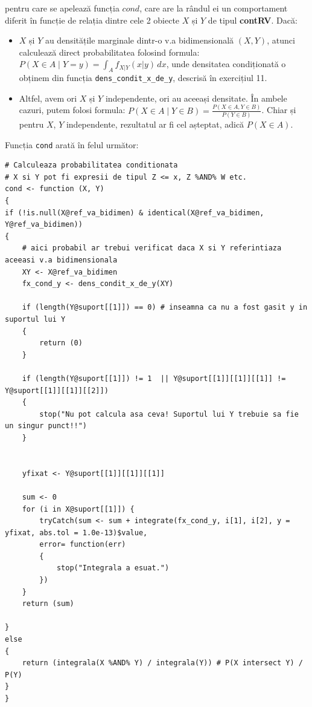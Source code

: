 \documentclass[12pt]{article}
\begin{document}
pentru care se apelează funcția $cond$, care are la rândul ei un comportament diferit în funcție de relația dintre cele 2 obiecte $X$ și $Y$ de tipul \textbf{contRV}. Dacă:
\begin{itemize}
\item $X$ și $Y$ au densitățile marginale dintr-o v.a bidimensională $(X, Y)$, atunci calculează direct probabilitatea folosind formula: $\displaystyle P(X \in A \mid Y = y) = \int_{A} f_{X|Y}(x|y) \,dx$, unde densitatea condiționată o obținem din funcția \texttt{dens\_condit\_x\_de\_y}, descrisă în exercițiul 11.
\item Altfel, avem ori $X$ și $Y$ independente, ori au aceeași densitate. În ambele cazuri, putem folosi formula: $\displaystyle P(X \in A \mid Y \in B) = \frac{P(X \in A, Y \in B)}{P(Y \in B)}$. Chiar și pentru $X$, $Y$ independente, rezultatul ar fi cel așteptat, adică $P(X \in A)$.
\end{itemize}\pagebreak

Funcția \texttt{cond} arată în felul următor:
\begin{lstlisting}
# Calculeaza probabilitatea conditionata
# X si Y pot fi expresii de tipul Z <= x, Z %AND% W etc.
cond <- function (X, Y)
{
if (!is.null(X@ref_va_bidimen) & identical(X@ref_va_bidimen, Y@ref_va_bidimen))
{
	# aici probabil ar trebui verificat daca X si Y referintiaza aceeasi v.a bidimensionala
	XY <- X@ref_va_bidimen
	fx_cond_y <- dens_condit_x_de_y(XY)
	
	if (length(Y@suport[[1]]) == 0) # inseamna ca nu a fost gasit y in suportul lui Y
	{
		return (0)
	}
	
	if (length(Y@suport[[1]]) != 1  || Y@suport[[1]][[1]][[1]] != Y@suport[[1]][[1]][[2]])
	{
		stop("Nu pot calcula asa ceva! Suportul lui Y trebuie sa fie un singur punct!!")
	}
	
	
	yfixat <- Y@suport[[1]][[1]][[1]]
	
	sum <- 0
	for (i in X@suport[[1]]) {
		tryCatch(sum <- sum + integrate(fx_cond_y, i[1], i[2], y = yfixat, abs.tol = 1.0e-13)$value,
		error= function(err)
		{
			stop("Integrala a esuat.")
		})
	}
	return (sum)
	
}
else
{
	return (integrala(X %AND% Y) / integrala(Y)) # P(X intersect Y) / P(Y)
}
}
\end{lstlisting}\pagebreak
\end{document}
